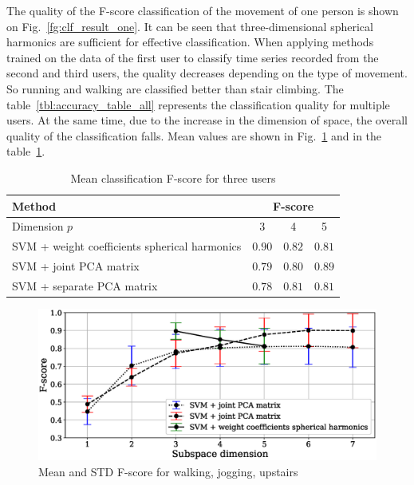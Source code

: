 \documentclass[12pt,twoside]{article}
\begin{document}
The quality of the F-score classification of the movement of one person is shown on Fig.~\ref{fg:clf_result_one}.
It can be seen that three-dimensional spherical harmonics are sufficient for effective classification.
When applying methods trained on the data of the first user to classify time series recorded from the second and third users, the quality decreases depending on the type of movement.
So running and walking are classified better than stair climbing.
The table~\ref{tbl:accuracy_table_all} represents the classification quality for multiple users.
At the same time, due to the increase in the dimension of space, the overall quality of the classification falls. Mean values are shown in Fig.~\ref{fg:clf_result_many} and in the table~\ref{tbl:accuracy_table_mean}.

\begin{otherlanguage}{english}
\begin{table}[H]
    \caption{Mean classification F-score for three users}
    \label{tbl:accuracy_table_mean}
    \centering\medskip\tabcolsep=12pt\small
    \begin{tabular}{l|ccc}
    \hline
        Method & \multicolumn{3}{c}{F-score}\\
    \hline
        Dimension $p$ & 3 & 4 & 5\\
    \hline
        {SVM + weight coefficients spherical harmonics}     & $0.90$ & $0.82$ & $0.81$ \\
        {SVM + joint PCA matrix} & $0.79$ & $0.80$ & $0.89$ \\
        {SVM + separate PCA matrix} & $0.78$ & $0.81$ & $0.81$ \\
    \hline
    \end{tabular}
\end{table}
\end{otherlanguage}

\begin{otherlanguage}{english}
\begin{figure}[H]
    \centering
    \includegraphics[scale=0.52]{./figs/result_mean_eng.eps}
    \caption{Mean and STD F-score for walking, jogging, upstairs}
    \label{fg:clf_result_many}
\end{figure}
\end{otherlanguage}
\end{document}
